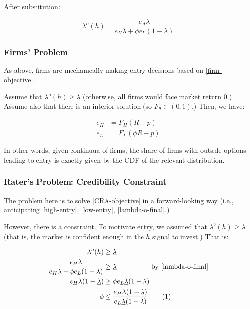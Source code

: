 \documentclass{article}
\newcommand\numberthis{\addtocounter{equation}{1}\tag{\theequation}}
\theoremstyle{definition}
\begin{document}
After substitution: 

\begin{equation}
    \label{lambda-o-final}
    \lambda^o(h) = \frac{e_H \lambda}{e_H \lambda + \phi e_L (1 - \lambda)}
\end{equation}

\subsubsection{Firms' Problem}

As above, firms are mechanically making entry decisions based on \eqref{firm-objective}. 

Assume that $\lambda^o(h) \geq \underline{\lambda}$ (otherwise, all firms would face market return 0.) Assume also that there is an interior solution (so $F_\theta \in (0, 1)$.) Then, we have: 

\begin{align}
    e_H &= F_H(R - p) \label{high-entry} \\ 
    e_L &= F_L(\phi R - p) \label{low-entry}
\end{align}

In other words, given continuua of firms, the share of firms with outside options leading to entry is exactly given by the CDF of the relevant distribution.

\subsubsection{Rater's Problem: Credibility Constraint}

The problem here is to solve \eqref{CRA-objective} in a forward-looking way (i.e., anticipating \eqref{high-entry}, \eqref{low-entry}, \eqref{lambda-o-final}.)

However, there is a constraint. To motivate entry, we assumed that $\lambda^o(h) \geq \underline{\lambda}$ (that is, the market is confident enough in the $h$ signal to invest.) That is: 

\begin{align*}
    \lambda^o(h) &\geq \underline{\lambda} \\ 
    \frac{e_H \lambda}{e_H \lambda + \phi e_L (1 - \lambda)} &\geq \underline{\lambda} \hspace{5 em} \text{by \eqref{lambda-o-final}} \\ 
    e_H \lambda (1 - \underline{\lambda}) &\geq \phi e_L \underline{\lambda} (1 - \lambda) \\ 
    \phi &\leq \frac{e_H \lambda (1 - \underline{\lambda})}{e_L \underline{\lambda} (1 - \lambda)} \label{MC-cons}\numberthis
\end{align*}
\end{document}
